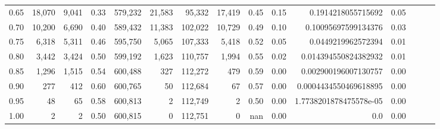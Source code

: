 \begin{tabular}{rrrrrrrrrrrrrrr}
0.65 &   18,070 &   9,041 &  0.33 &  579,232 &   21,583 &   95,332 &   17,419 &  0.45 &  0.15 &      0.1914218055715692 &      0.05 \\
0.70 &   10,200 &   6,690 &  0.40 &  589,432 &   11,383 &  102,022 &   10,729 &  0.49 &  0.10 &     0.10095697599134376 &      0.03 \\
0.75 &    6,318 &   5,311 &  0.46 &  595,750 &    5,065 &  107,333 &    5,418 &  0.52 &  0.05 &      0.0449219962572394 &      0.01 \\
0.80 &    3,442 &   3,424 &  0.50 &  599,192 &    1,623 &  110,757 &    1,994 &  0.55 &  0.02 &    0.014394550824382932 &      0.01 \\
0.85 &    1,296 &   1,515 &  0.54 &  600,488 &      327 &  112,272 &      479 &  0.59 &  0.00 &    0.002900196007130757 &      0.00 \\
0.90 &      277 &     412 &  0.60 &  600,765 &       50 &  112,684 &       67 &  0.57 &  0.00 &   0.0004434550469618895 &      0.00 \\
0.95 &       48 &      65 &  0.58 &  600,813 &        2 &  112,749 &        2 &  0.50 &  0.00 &  1.7738201878475578e-05 &      0.00 \\
1.00 &        2 &       2 &  0.50 &  600,815 &        0 &  112,751 &        0 &   nan &  0.00 &                     0.0 &      0.00 \\
\bottomrule
\end{tabular}
